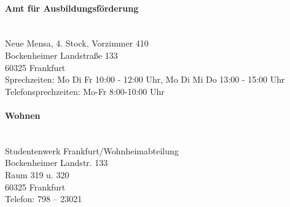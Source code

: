 \paragraph{Amt für Ausbildungsförderung}~\\
Neue Mensa, 4. Stock, Vorzimmer 410\\
Bockenheimer Landstraße 133\\
60325 Frankfurt\\
Sprechzeiten: Mo Di Fr 10:00 - 12:00 Uhr, Mo Di Mi Do 13:00 - 15:00 Uhr
Telefonsprechzeiten: Mo-Fr 8:00-10:00 Uhr\\

\paragraph{Wohnen}~\\
Studentenwerk Frankfurt/Wohnheimabteilung\\
Bockenheimer Landstr. 133\\
Raum 319 u. 320\\
60325 Frankfurt\\
Telefon: 798 – 23021\\

\spaltenende
